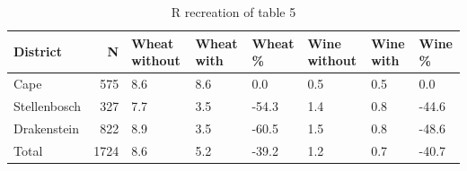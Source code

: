 \begin{table}

\caption{R recreation of table 5}
\centering
\begin{tabular}[t]{lrllllll}
\toprule
District & N & Wheat without & Wheat with & Wheat \% & Wine without & Wine with & Wine \%\\
\midrule
Cape & 575 & 8.6 & 8.6 & 0.0 & 0.5 & 0.5 & 0.0\\
Stellenbosch & 327 & 7.7 & 3.5 & -54.3 & 1.4 & 0.8 & -44.6\\
Drakenstein & 822 & 8.9 & 3.5 & -60.5 & 1.5 & 0.8 & -48.6\\
Total & 1724 & 8.6 & 5.2 & -39.2 & 1.2 & 0.7 & -40.7\\
\bottomrule
\end{tabular}
\end{table}
